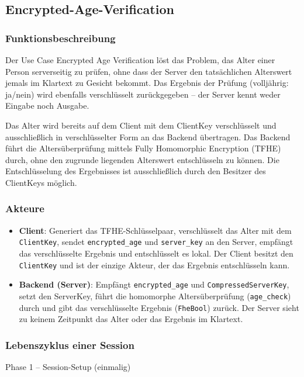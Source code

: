 \subsection{Encrypted-Age-Verification}
\label{sub:encrypted_age_verification}
\subsubsection{Funktionsbeschreibung}
Der Use Case Encrypted Age Verification löst das Problem, das Alter einer Person serverseitig zu prüfen, ohne dass der Server den tatsächlichen Alterswert jemals im Klartext zu Gesicht bekommt. Das Ergebnis der Prüfung (volljährig: ja/nein) wird ebenfalls verschlüsselt zurückgegeben -- der Server kennt weder Eingabe noch Ausgabe. \par
Das Alter wird bereits auf dem Client mit dem ClientKey verschlüsselt und ausschließlich in verschlüsselter Form an das Backend übertragen.
Das Backend führt die Altersüberprüfung mittels Fully Homomorphic Encryption (TFHE) durch, ohne den zugrunde liegenden Alterswert entschlüsseln zu können.
Die Entschlüsselung des Ergebnisses ist ausschließlich durch den Besitzer des ClientKeys möglich.

\subsubsection{Akteure}
\begin{itemize}
    \item \textbf{Client}: Generiert das TFHE-Schlüsselpaar, verschlüsselt das Alter mit dem \verb|ClientKey|, sendet \verb|encrypted_age| und \verb|server_key| an den Server, empfängt das verschlüsselte Ergebnis und entschlüsselt es lokal. Der Client besitzt den \verb|ClientKey| und ist der einzige Akteur, der das Ergebnis entschlüsseln kann.
    \item \textbf{Backend (Server)}: Empfängt \verb|encrypted_age| und \verb|CompressedServerKey|, setzt den ServerKey, führt die homomorphe Altersüberprüfung (\verb|age_check|) durch und gibt das verschlüsselte Ergebnis (\verb|FheBool|) zurück. Der Server sieht zu keinem Zeitpunkt das Alter oder das Ergebnis im Klartext.
\end{itemize}

\subsubsection{Lebenszyklus einer Session}
{Phase 1 -- Session-Setup (einmalig)}

